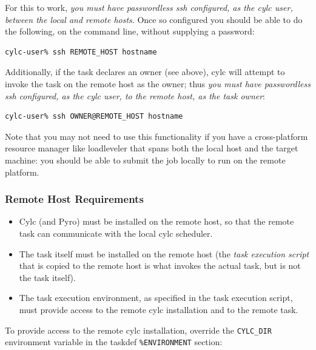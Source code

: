 \documentclass[11pt,a4paper]{article}
\begin{document}
For this to work, {\em you must have passwordless ssh configured, as 
the cylc user, between the local and remote hosts}. Once so configured
you should be able to do the following, on the command line, without
supplying a password:

\begin{lstlisting}
cylc-user% ssh REMOTE_HOST hostname
\end{lstlisting}


Additionally, if the task declares an owner (see above), cylc will attempt
to invoke the task on the remote host as the owner; thus {\em you must
have passwordless ssh configured, as the cylc user, to the remote host,
as the task owner}:

\begin{lstlisting}
cylc-user% ssh OWNER@REMOTE_HOST hostname
\end{lstlisting}

Note that you may not need to use this functionality if you have a
cross-platform resource manager like loadleveler that spans both the
local host and the target machine: you should be able to submit the job locally to run on the remote platform.

\subsubsection{Remote Host Requirements}

\begin{itemize}

    \item Cylc (and Pyro) must be installed on the remote host, so that 
        the remote task can communicate with the local cylc scheduler.
        
    \item The task itself must be installed on the remote host (the {\em
        task execution script} that is copied to the remote host is what
        invokes the actual task, but is not the task itself). 

    \item The task execution environment, as specified in the task
        execution script, must provide access to the remote cylc
        installation and to the remote task.

\end{itemize}

\lstset{language=cylctaskdef}

To provide access to the remote cylc installation, override the 
\lstinline=CYLC_DIR= environment variable in the taskdef
\lstinline=%ENVIRONMENT= section:
\end{document}

